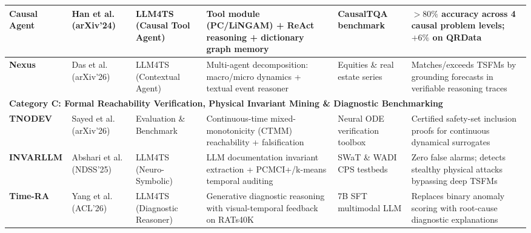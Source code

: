 \begin{table}[t]
{\begin{tabular}{llllll}
\midrule
\textbf{Causal Agent} & Han et al.~\cite{han2024causalagent} (arXiv'24) & LLM4TS (Causal Tool Agent) & Tool module (PC/LiNGAM) + ReAct reasoning + dictionary graph memory & CausalTQA benchmark & $>80\%$ accuracy across 4 causal problem levels; $+6\%$ on QRData \\
\midrule
\textbf{Nexus} & Das et al.~\cite{das2026nexus} (arXiv'26) & LLM4TS (Contextual Agent) & Multi-agent decomposition: macro/micro dynamics + textual event reasoner & Equities \& real estate series & Matches/exceeds TSFMs by grounding forecasts in verifiable reasoning traces \\
\midrule
\multicolumn{6}{l}{\textbf{Category C: Formal Reachability Verification, Physical Invariant Mining \& Diagnostic Benchmarking}} \\
\midrule
\textbf{TNODEV} & Sayed et al.~\cite{sayed2026tnodev} (arXiv'26) & Evaluation \& Benchmark & Continuous-time mixed-monotonicity (CTMM) reachability + falsification & Neural ODE verification toolbox & Certified safety-set inclusion proofs for continuous dynamical surrogates \\
\midrule
\textbf{INVARLLM} & Abshari et al.~\cite{abshari2025invarllm} (NDSS'25) & LLM4TS (Neuro-Symbolic) & LLM documentation invariant extraction + PCMCI+/k-means temporal auditing & SWaT \& WADI CPS testbeds & Zero false alarms; detects stealthy physical attacks bypassing deep TSFMs \\
\midrule
\textbf{Time-RA} & Yang et al.~\cite{yang2026timera} (ACL'26) & LLM4TS (Diagnostic Reasoner) & Generative diagnostic reasoning with visual-temporal feedback on RATs40K & 7B SFT multimodal LLM & Replaces binary anomaly scoring with root-cause diagnostic explanations \\
\bottomrule
\end{tabular}
}
\end{table}



